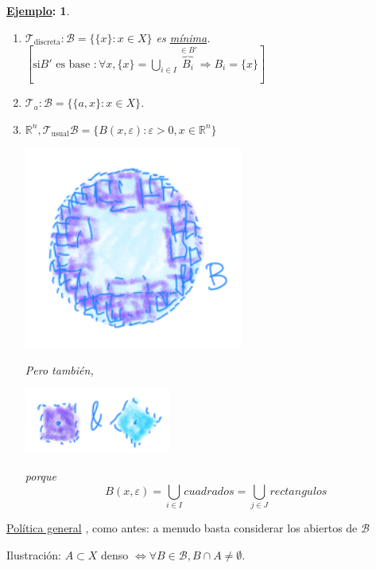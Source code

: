 \documentclass[10pt,a4paper,openright]{book}
\theoremstyle{break}
\newtheorem*{ej}{\underline{Ejemplo}:}
\begin{document}
\begin{ej}
\begin{enumerate}
    \item $\mathcal{T}_{\text{discreta}} : \mathcal{B} = \{\{x\} : x \in X\}$ es \underline{mínima}. $\left[ \text{si} B' \text{ es base } : \forall x, \{x\} = \bigcup_{i \in  I} \overbrace{B_i}^{\in B'} \Rightarrow B_i = \{x\} \right]$ 
    \item $\mathcal{T}_a: \mathcal{B} = \{\{a, x\} : x \in X\}$.
    \item $\mathbb{R}^n, \mathcal{T}_{\text{usual}} \mathcal{B} = \{B\left( x, \varepsilon \right) : \varepsilon > 0, x \in \mathbb{R}^n\}$
    \begin{center}
        \includegraphics[scale=0.3]{images/base_rn} 
    \end{center}
    Pero también,
    \begin{center}
        \includegraphics[scale=0.3]{images/bases_alternativas_rn} 
    \end{center}
    porque
    \[
    B\left( x, \varepsilon \right) = \bigcup_{i \in  I} cuadrados = \bigcup_{j \in J} rectangulos
    \]
\end{enumerate}
\end{ej}

\underline{Política general} , como antes: a menudo basta considerar los abiertos de $\mathcal{B}$ 

Ilustración: $A \subset X$ denso $\Leftrightarrow \forall B \in \mathcal{B}, B \cap A \neq \emptyset$.
\end{document}
